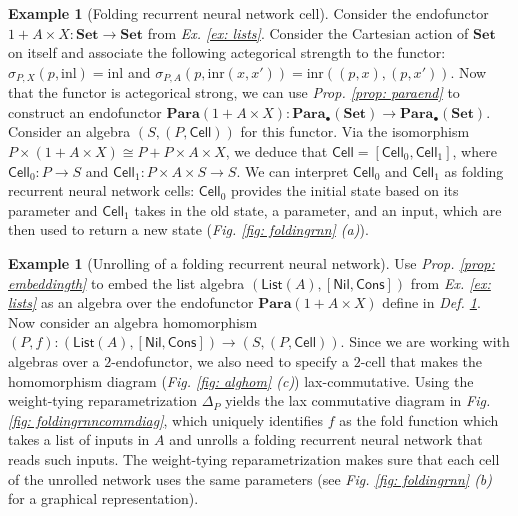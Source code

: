 \documentclass[11pt,a4paper,openright,twoside]{report}
\newcounter{mycounter}
\theoremstyle{plain}
\theoremstyle{definition}
\newtheorem{example}[mycounter]{Example}
\begin{document}
\begin{example}[Folding recurrent neural network cell]
  \label{ex: frnncell}
  Consider the endofunctor $1 + A \times X: \mathbf{Set} \to \mathbf{Set}$ from \textit{Ex. \ref{ex: lists}}. Consider the Cartesian action of $\mathbf{Set}$ on itself and associate the following actegorical strength to the functor: $\sigma_{P,X}(p,\mathrm{inl}) = \mathrm{inl}$ and  $\sigma_{P,A}(p,\mathrm{inr}(x,x')) = \mathrm{inr}((p,x), (p,x'))$. Now that the functor is actegorical strong, we can use \textit{Prop. \ref{prop: paraend}} to construct an endofunctor $\mathbf{Para}(1 + A \times X): \mathbf{Para}_{\bullet}(\mathbf{Set}) \to \mathbf{Para}_{\bullet}(\mathbf{Set})$. Consider an algebra $(S,(P,\mathsf{Cell}))$ for this functor. Via the isomorphism $P \times (1 + A \times X) \cong P + P \times A \times X$, we deduce that $\mathsf{Cell} = [\mathsf{Cell}_0, \mathsf{Cell}_1]$, where $\mathsf{Cell}_0: P \to S$ and  $\mathsf{Cell}_1: P \times A \times S \to S$. We can interpret $\mathsf{Cell}_0$ and $\mathsf{Cell}_1$ as folding recurrent neural network cells: $\mathsf{Cell}_0$ provides the initial state based on its parameter and $\mathsf{Cell}_1$ takes in the old state, a parameter, and an input, which are then used to return a new state (\textit{Fig. \ref{fig: foldingrnn} (a)}).
\end{example}

\begin{example}[Unrolling of a folding recurrent neural network]
  \label{ex: frnnunroll}
  Use \textit{Prop. \ref{prop: embeddingth}} to embed the list algebra $(\mathsf{List}(A), [\mathsf{Nil}, \mathsf{Cons}])$ from \textit{Ex. \ref{ex: lists}} as an algebra over the endofunctor $\mathbf{Para}(1 + A \times X)$ define in \textit{Def. \ref{ex: frnncell}}. Now consider an algebra homomorphism $(P,f): (\mathsf{List}(A), [\mathsf{Nil}, \mathsf{Cons}]) \to (S,(P,\mathsf{Cell}))$. Since we are working with algebras over a $2$-endofunctor, we also need to specify a $2$-cell that makes the homomorphism diagram (\textit{Fig. \ref{fig: alghom} (c)}) lax-commutative. Using the weight-tying reparametrization $\Delta_P$ yields the lax commutative diagram in \textit{Fig. \ref{fig: foldingrnncommdiag}}, which uniquely identifies $f$ as the fold function which takes a list of inputs in $A$ and unrolls a folding recurrent neural network that reads such inputs. The weight-tying reparametrization makes sure that each cell of the unrolled network uses the same parameters (see \textit{Fig. \ref{fig: foldingrnn} (b)} for a graphical representation). 
\end{example}
\end{document}
